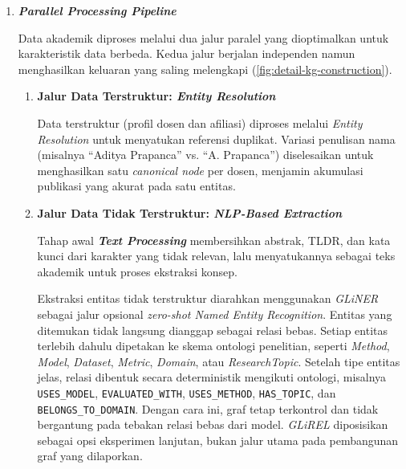 \begin{enumerate}[label=\textbf{\arabic*.}, leftmargin=*, itemsep=10pt]
\begin{enumerate}[label=\textbf{\arabic*.}, leftmargin=0.75cm, itemsep=5pt]
              \item \textbf{\textit{Parallel Processing Pipeline}}

                    \hspace*{0.75cm}Data akademik diproses melalui dua jalur paralel yang dioptimalkan untuk karakteristik data berbeda. Kedua jalur berjalan independen namun menghasilkan keluaran yang saling melengkapi (\ref{fig:detail-kg-construction}).

                    \begin{enumerate}[label=\textbf{\alph*.}, leftmargin=0.75cm, itemsep=5pt]

                        \item \textbf{Jalur Data Terstruktur: \textit{Entity Resolution}}

                              \hspace*{0.75cm}Data terstruktur (profil dosen dan afiliasi) diproses melalui \textit{Entity Resolution} untuk menyatukan referensi duplikat. Variasi penulisan nama (misalnya ``Aditya Prapanca'' vs. ``A. Prapanca'') diselesaikan untuk menghasilkan satu \textit{canonical node} per dosen, menjamin akumulasi publikasi yang akurat pada satu entitas.

                        \item \textbf{Jalur Data Tidak Terstruktur: \textit{NLP-Based Extraction}}

                              \hspace*{0.75cm}Tahap awal \textbf{\textit{Text Processing}} membersihkan abstrak, TLDR, dan kata kunci dari karakter yang tidak relevan, lalu menyatukannya sebagai teks akademik untuk proses ekstraksi konsep.

                              \hspace*{0.75cm}Ekstraksi entitas tidak terstruktur diarahkan menggunakan \textit{GLiNER} \cite{zaratiana2023gliner} sebagai jalur opsional \textit{zero-shot Named Entity Recognition}. Entitas yang ditemukan tidak langsung dianggap sebagai relasi bebas. Setiap entitas terlebih dahulu dipetakan ke skema ontologi penelitian, seperti \textit{Method}, \textit{Model}, \textit{Dataset}, \textit{Metric}, \textit{Domain}, atau \textit{ResearchTopic}. Setelah tipe entitas jelas, relasi dibentuk secara deterministik mengikuti ontologi, misalnya \texttt{USES\_MODEL}, \texttt{EVALUATED\_WITH}, \texttt{USES\_METHOD}, \texttt{HAS\_TOPIC}, dan \texttt{BELONGS\_TO\_DOMAIN}. Dengan cara ini, graf tetap terkontrol dan tidak bergantung pada tebakan relasi bebas dari model. \textit{GLiREL} diposisikan sebagai opsi eksperimen lanjutan, bukan jalur utama pada pembangunan graf yang dilaporkan.


\end{enumerate}
\end{enumerate}
\end{enumerate}
